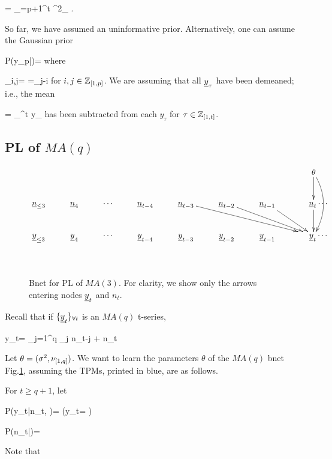 \beq
{}=
\sum_{\tau=p+1}^t \eps^2_\tau
\;.
\eeq


So far, we have assumed an
uninformative prior.
Alternatively, one can assume
the Gaussian prior

\beq
P(y_{\leq p}|\theta)=
\exp
{}
\eeq
where

\beq
\Gamma_{i,j}=
=\gamma_{j-i}
\eeq
for $i,j\in {\mathbb{Z}}_{[1,p]}$.
We are assuming that all $\rvy_\tau$
have been demeaned;
i.e., the mean

\beq
\HAT{\mu}= \sum_{}^t y_\tau
\eeq
has been subtracted from each $y_\tau$
for $\tau\in{\mathbb{Z}}_{[1,t]}$.

\subsection{\;\;\;PL of $MA(q)$}

\begin{figure}[h!]
$$
\xymatrix{
&&&&&&&\theta\ar[d]\ar@/^1pc/[dd]
\\
\rvn_{\leq 3}
&\rvn_{4}
&\cdots
&\rvn_{t-4}
&\rvn_{t-3}\ar[drrr]
&\rvn_{t-2}\ar[drr]
&\rvn_{t-1}\ar[dr]
&\;\;\;\;\rvn_{t}\ar[d]
\cdots
\\
\rvy_{\leq 3}
&\rvy_{4}
&\cdots
&\rvy_{t-4}
&\rvy_{t-3}
&\rvy_{t-2}
&\rvy_{t-1}
&\;\;\;\;\rvy_{t}
\cdots
\\
\;
}
$$
\caption{Bnet for PL of
$MA(3)$.
For clarity,
we show only the
arrows entering nodes $\rvy_t$
and $n_t$.}
\label{fig-qmle-ma-3}
\end{figure}



Recall that
if $\tseries{\rvy_t}$ is an $MA(q)$
t-series,

\beq
y_t=
\sum_{j=1}^q
\nu_j n_{t-j} + n_t
\label{eq-qmle-ma-q-def}
\eeq

Let $\theta=(\sigma^2, \nu_{[1,q]})$.
We want to learn the parameters
$\theta$
of the $MA(q)$ bnet Fig.\ref{fig-qmle-ma-3},
assuming the TPMs, printed in blue,
are as follows.

For $t\geq q+1$, let

\beq\color{blue}
P(y_t|n_{\leq t}, \theta)=
\indi\left(y_t=
\right)
\eeq

\beq\color{blue}
P(n_t|\theta)=
{\s\sqrt{2\pi}}
\exp{}
\eeq

Note that

